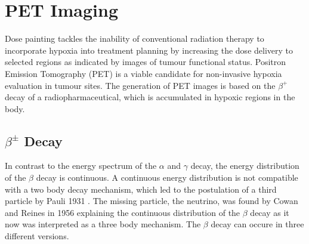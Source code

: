 \section{PET Imaging}
Dose painting tackles the inability of conventional radiation therapy to incorporate hypoxia into treatment planning by increasing the dose delivery to selected regions as indicated by images of tumour functional status. Positron Emission Tomography (PET) is a viable candidate for non-invasive hypoxia evaluation in tumour sites. The generation of PET images is based on the $\beta^+$ decay of a radiopharmaceutical, which is accumulated in hypoxic regions in the body. 
\subsection{$\beta^\pm$ Decay}
In contrast to the energy spectrum of the $\alpha$ and $\gamma$ decay, the energy distribution of the $\beta$ decay is continuous. A continuous energy distribution is not compatible with a two body decay mechanism, which led to the postulation of a third particle by Pauli 1931 \cite{?}. The missing particle, the neutrino, was found by Cowan and Reines in 1956 \cite{?} explaining the continuous distribution of the $\beta$ decay as it now was interpreted as a three body mechanism. The $\beta$ decay can occure in three different versions.
